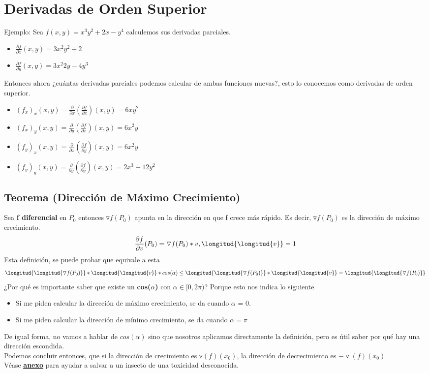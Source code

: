 \documentclass[10pt,a4paper]{article}
\begin{document}
\section*{Derivadas de Orden Superior}
Ejemplo: Sea $f(x,y) = x^{3}y^{2} + 2x - y^{4}$ calculemos sus derivadas parciales. 
\begin{itemize}
    \item $\frac{\partial f}{\partial x}(x,y) = 3x^{2}y^{2} + 2$
    \item $\frac{\partial f}{\partial y}(x,y) = 3x^{2}2y - 4y^{3}$
\end{itemize}
Entonces ahora ¿cuántas derivadas parciales podemos calcular de ambas funciones nuevas?, esto lo conocemos como derivadas de orden superior.
\begin{itemize}
    \item $(f_{x})_{x}(x, y) = \frac{\partial}{\partial x}(\frac{\partial f}{\partial x})(x,y) = 6xy^{2}$
    \item $(f_{x})_{y}(x, y) = \frac{\partial}{\partial y}(\frac{\partial f}{\partial x})(x,y) = 6x^{2}y$
    \item $(f_{y})_{x}(x, y) = \frac{\partial}{\partial x}(\frac{\partial f}{\partial y})(x,y) = 6x^{2}y$
    \item $(f_{y})_{y}(x, y) = \frac{\partial}{\partial y}(\frac{\partial f}{\partial y})(x,y) = 2x^{3}-12y^{2}$
\end{itemize}
\subsection*{Teorema (Dirección de Máximo Crecimiento)}
\label{subsec:direccion_maximo_crecimiento}
Sea \textbf{f diferencial} en $P_{0}$ entonces $\triangledown f(P_{0})$ apunta en la dirección en que f crece más rápido. Es decir, $\triangledown f (P_{0})$ es la dirección de máximo crecimiento. \\
\[\frac{\partial f}{\partial v}(P_{0}) = \triangledown f(P_{0}) * v, \longitud{\longitud{v}} = 1\]
Esta definición, se puede probar que equivale a esta 
\[\longitud{\longitud{\triangledown f (P_{0})}} * \longitud{\longitud{v}} * cos(\alpha) \le \longitud{\longitud{\triangledown f (P_{0})}} * \longitud{\longitud{v}} = \longitud{\longitud{\triangledown f (P_{0})}}\]
¿Por qué es importante saber que existe un \textbf{cos($\alpha$)} con $\alpha \in [0, 2\pi)$? Porque esto nos indica lo siguiente
\begin{itemize}
    \item Si me piden calcular la dirección de máximo crecimiento, se da cuando $\alpha$ = 0.
    \item Si me piden calcular la dirección de mínimo crecimiento, se da cuando $\alpha = \pi $
\end{itemize}
De igual forma, no vamos a hablar de $cos(\alpha)$ sino que nosotros aplicamos directamente la definición, pero es útil saber por qué hay una dirección escondida. \\
Podemos concluir entonces, que si la dirección de crecimiento es $\triangledown(f)(x_{0})$, la dirección de decrecimiento es $-\triangledown(f)(x_{0})$ \\
Véase \hyperref[subsec:maxima_minima_direccion]{\textbf{\underline{anexo}}} para ayudar a salvar a un insecto de una toxicidad desconocida.
\end{document}
